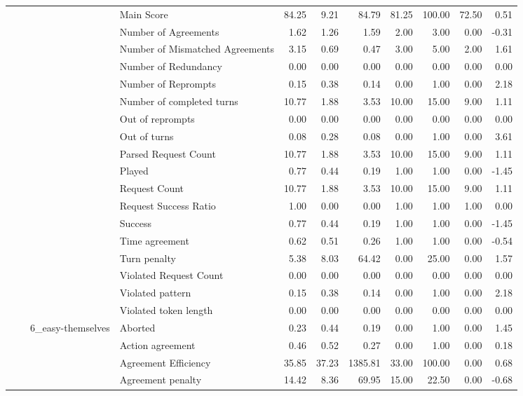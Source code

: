 \begin{tabular}{llllrrrrrrr}
 &  &  & Main Score & 84.25 & 9.21 & 84.79 & 81.25 & 100.00 & 72.50 & 0.51 \\
 &  &  & Number of Agreements & 1.62 & 1.26 & 1.59 & 2.00 & 3.00 & 0.00 & -0.31 \\
 &  &  & Number of Mismatched Agreements & 3.15 & 0.69 & 0.47 & 3.00 & 5.00 & 2.00 & 1.61 \\
 &  &  & Number of Redundancy & 0.00 & 0.00 & 0.00 & 0.00 & 0.00 & 0.00 & 0.00 \\
 &  &  & Number of Reprompts & 0.15 & 0.38 & 0.14 & 0.00 & 1.00 & 0.00 & 2.18 \\
 &  &  & Number of completed turns & 10.77 & 1.88 & 3.53 & 10.00 & 15.00 & 9.00 & 1.11 \\
 &  &  & Out of reprompts & 0.00 & 0.00 & 0.00 & 0.00 & 0.00 & 0.00 & 0.00 \\
 &  &  & Out of turns & 0.08 & 0.28 & 0.08 & 0.00 & 1.00 & 0.00 & 3.61 \\
 &  &  & Parsed Request Count & 10.77 & 1.88 & 3.53 & 10.00 & 15.00 & 9.00 & 1.11 \\
 &  &  & Played & 0.77 & 0.44 & 0.19 & 1.00 & 1.00 & 0.00 & -1.45 \\
 &  &  & Request Count & 10.77 & 1.88 & 3.53 & 10.00 & 15.00 & 9.00 & 1.11 \\
 &  &  & Request Success Ratio & 1.00 & 0.00 & 0.00 & 1.00 & 1.00 & 1.00 & 0.00 \\
 &  &  & Success & 0.77 & 0.44 & 0.19 & 1.00 & 1.00 & 0.00 & -1.45 \\
 &  &  & Time agreement & 0.62 & 0.51 & 0.26 & 1.00 & 1.00 & 0.00 & -0.54 \\
 &  &  & Turn penalty & 5.38 & 8.03 & 64.42 & 0.00 & 25.00 & 0.00 & 1.57 \\
 &  &  & Violated Request Count & 0.00 & 0.00 & 0.00 & 0.00 & 0.00 & 0.00 & 0.00 \\
 &  &  & Violated pattern & 0.15 & 0.38 & 0.14 & 0.00 & 1.00 & 0.00 & 2.18 \\
 &  &  & Violated token length & 0.00 & 0.00 & 0.00 & 0.00 & 0.00 & 0.00 & 0.00 \\
\cline{3-11}
 &  & \multirow[t]{27}{*}{6_easy-themselves} & Aborted & 0.23 & 0.44 & 0.19 & 0.00 & 1.00 & 0.00 & 1.45 \\
 &  &  & Action agreement & 0.46 & 0.52 & 0.27 & 0.00 & 1.00 & 0.00 & 0.18 \\
 &  &  & Agreement Efficiency & 35.85 & 37.23 & 1385.81 & 33.00 & 100.00 & 0.00 & 0.68 \\
 &  &  & Agreement penalty & 14.42 & 8.36 & 69.95 & 15.00 & 22.50 & 0.00 & -0.68 \\

\end{tabular}
